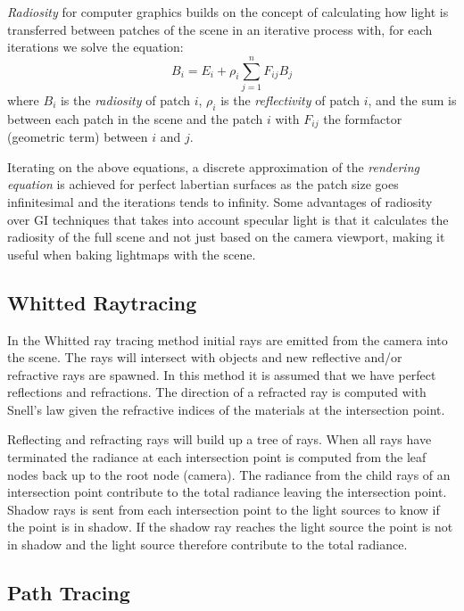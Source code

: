 \documentclass[a4paper, twocolumn]{article}
\begin{document}
    \textit{Radiosity} for computer graphics builds on the concept of calculating how light is transferred between patches of the scene in an iterative process with, for each iterations we solve the equation: \begin{equation*}
        B_i = E_i + \rho_i \sum_{j=1}^{n} F_{ij} B_j
    \end{equation*}
    where \(B_i\) is the \textit{radiosity} of patch \(i\), \(\rho_i\) is the \textit{reflectivity} of patch \(i\), and the sum is between each patch in the scene and the patch \(i\) with \(F_{ij} \) the formfactor (geometric term) between \(i\) and \(j\).

Iterating on the above equations, a discrete approximation of the \textit{rendering equation} is achieved for perfect labertian surfaces as the patch size goes infinitesimal and the iterations tends to infinity. Some advantages of radiosity over GI techniques that takes into account specular light is that it calculates the radiosity of the full scene and not just based on the camera viewport, making it useful when baking lightmaps with the scene.     

    \subsection{Whitted Raytracing} \label{sec:whitted_raytracing}

    In the Whitted ray tracing method initial rays are emitted from the camera into the scene. The rays will intersect with objects and new reflective and/or refractive rays are spawned. In this method it is assumed that we have perfect reflections and refractions. The direction of a refracted ray is computed with Snell's law given the refractive indices of the materials at the intersection point.

    Reflecting and refracting rays will build up a tree of rays. When all rays have terminated the radiance at each intersection point is computed from the leaf nodes back up to the root node (camera). The radiance from the child rays of an intersection point contribute to the total radiance leaving the intersection point. Shadow rays is sent from each intersection point to the light sources to know if the point is in shadow. If the shadow ray reaches the light source the point is not in shadow and the light source therefore contribute to the total radiance. 

    \subsection{Path Tracing} \label{sec:path_tracing}
\end{document}
